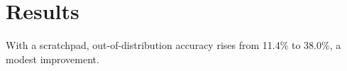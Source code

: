 \section{Results}
With a scratchpad, out-of-distribution accuracy rises from 11.4\% to 38.0\%, a modest improvement.
